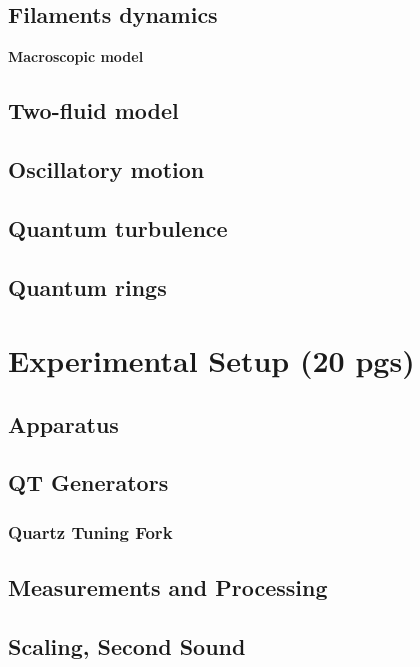 \documentclass[a4paper, 12pt]{report}
\newcommand{\<}{\langle} %
\renewcommand{\>}{\rangle} %
\begin{document}
\section{Filaments dynamics}

{\Huge \bfseries Macroscopic model}
\vspace{0.3cm}

\section{Two-fluid model}

\section{Oscillatory motion}

\section{Quantum turbulence}

\section{Quantum rings}

\newpage

\chapter{Experimental Setup (20 pgs)}

\section{Apparatus}

\section{QT Generators}

\subsection*{Quartz Tuning Fork}

\section{Measurements and Processing}

\section{Scaling, Second Sound}
\end{document}
